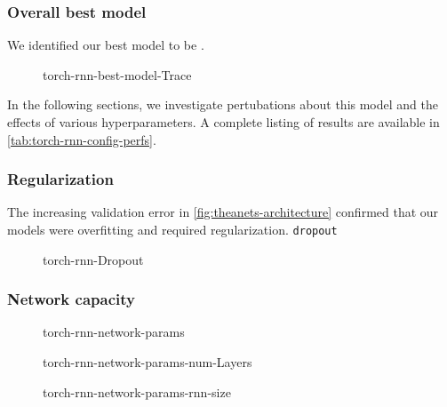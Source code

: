\subsubsection{Overall best model}

We identified our best model to be .

\begin{figure}[tb]
  \centering
  
  \caption{torch-rnn-best-model-Trace}
  \label{fig:torch-rnn-best-model-trace}
\end{figure}

In the following sections, we investigate pertubations about this model and the
effects of various hyperparameters. A complete listing of results are available
in
\cref{tab:torch-rnn-config-perfs}.

\subsubsection{Regularization}

The increasing validation error in \cref{fig:theanets-architecture} confirmed
that our models were overfitting and required regularization. \texttt{dropout}

\begin{figure}[tb]
  \centering
  
  \caption{torch-rnn-Dropout}
  \label{fig:torch-rnn-dropout}
\end{figure}


\subsubsection{Network capacity}

\begin{figure}[tb]
    \centering
  
    \caption{torch-rnn-network-params}
    \label{fig:torch-rnn-network-params}
\end{figure}

\begin{figure}[tb]
  \centering
  
  \caption{torch-rnn-network-params-num-Layers}
  \label{fig:torch-rnn-network-params-num-layers}
\end{figure}

\begin{figure}[tb]
  \centering
  
  \caption{torch-rnn-network-params-rnn-size}
  \label{fig:torch-rnn-network-params-rnn-size}
\end{figure}

